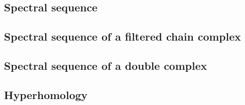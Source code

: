 \documentclass[../main.tex]{subfiles}
\begin{document}
\subsection{Spectral sequence}

\newpage

\subsection{Spectral sequence of a filtered chain complex}

\newpage

\subsection{Spectral sequence of a double complex}

\newpage

\subsection{Hyperhomology}

\newpage
\end{document}
